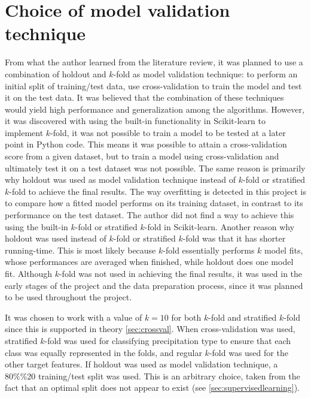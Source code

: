 \section{Choice of model validation technique}
	From what the author learned from the literature review, it was planned to use a combination of holdout and $k$-fold as model validation technique: to perform an initial split of training/test data, use cross-validation to train the model and test it on the test data. It was believed that the combination of these techniques would yield high performance and generalization among the algorithms. However, it was discovered with using the built-in functionality in Scikit-learn to implement $k$-fold, it was not possible to train a model to be tested at a later point in Python code. This means it was possible to attain a cross-validation score from a given dataset, but to train a model using cross-validation and ultimately test it on a test dataset was not possible. The same reason is primarily why holdout was used as model validation technique instead of $k$-fold or stratified $k$-fold to achieve the final results. The way overfitting is detected in this project is to compare how a fitted model performs on its training dataset, in contrast to its performance on the test dataset. The author did not find a way to achieve this using the built-in $k$-fold or stratified $k$-fold in Scikit-learn. Another reason why holdout was used instead of $k$-fold or stratified $k$-fold was that it has shorter running-time. This is most likely because $k$-fold essentially performs $k$ model fits, whose performances are averaged when finished, while holdout does one model fit. Although $k$-fold was not used in achieving the final results, it was used in the early stages of the project and the data preparation process, since it was planned to be used throughout the project. 

	It was chosen to work with a value of $k= 10$ for both $k$-fold and stratified $k$-fold since this is supported in theory \ref{sec:crossval}. When cross-validation was used, stratified $k$-fold was used for classifying precipitation type to ensure that each class was equally represented in the folds, and regular $k$-fold was used for the other target features. If holdout was used as model validation technique, a 80\%\/\%20 training/test split was used. This is an arbitrary choice, taken from the fact that an optimal split does not appear to exist (see \ref{sec:supervisedlearning}).

